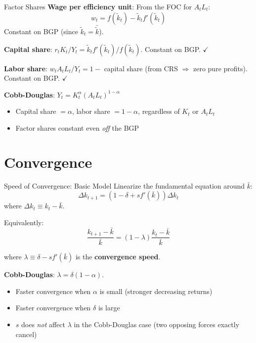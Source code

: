 \documentclass[blue]{beamer}
\begin{document}
\begin{frame}{Factor Shares}
	\textbf{Wage per efficiency unit}: From the FOC for $A_t L_t$:
	\[
	w_t = f(\tilde{k}_t) - \tilde{k}_t f'(\tilde{k}_t)
	\]
	Constant on BGP (since $\tilde{k}_t = \bar{\tilde{k}}$).
	
	\bigskip
	\textbf{Capital share}: $r_t K_t / Y_t = \tilde{k}_t f'(\tilde{k}_t)/f(\tilde{k}_t)$. Constant on BGP. $\checkmark$
	
	\bigskip
	\textbf{Labor share}: $w_t A_t L_t / Y_t = 1 - $ capital share (from CRS $\Rightarrow$ zero pure profits). Constant on BGP. $\checkmark$
	
	\bigskip
	\textbf{Cobb-Douglas}: $Y_t = K_t^\alpha (A_t L_t)^{1-\alpha}$
	\begin{itemize}
		\item Capital share $= \alpha$, labor share $= 1-\alpha$, regardless of $K_t$ or $A_t L_t$
		\item Factor shares constant even \emph{off} the BGP
	\end{itemize}
\end{frame}


\section{Convergence}

\begin{frame}{Speed of Convergence: Basic Model}
	Linearize the fundamental equation around $\bar{k}$:
	\[
	\Delta k_{t+1} = (1 - \delta + sf'(\bar{k}))\Delta k_t
	\]
	where $\Delta k_t \equiv k_t - \bar{k}$.
	

	Equivalently:
	\[
	\frac{k_{t+1} - \bar{k}}{\bar{k}} = (1-\lambda)\frac{k_t - \bar{k}}{\bar{k}}
	\]
	
	where $\lambda \equiv \delta - sf'(\bar{k})$ is the \textbf{convergence speed}.
	

	\textbf{Cobb-Douglas}: $\lambda = \delta(1-\alpha)$.
	\vspace{-6pt}
	\begin{itemize}
		\item Faster convergence when $\alpha$ is small (stronger decreasing returns)
		\item Faster convergence when $\delta$ is large
		\item $s$ does \emph{not} affect $\lambda$ in the Cobb-Douglas case (two opposing forces exactly cancel)
	\end{itemize}
\end{frame}
\end{document}
